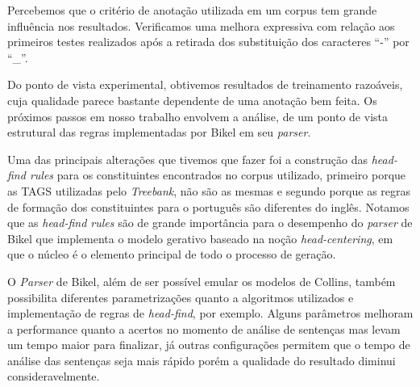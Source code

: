 Percebemos que o critério de anotação utilizada em um corpus tem grande influência nos resultados. Verificamos uma melhora expressiva com relação aos primeiros testes realizados após a retirada dos substituição dos caracteres ``{-}'' por ``\_''.

Do ponto de vista experimental, obtivemos resultados de treinamento razoáveis, cuja qualidade parece bastante dependente de uma anotação bem feita. Os próximos passos em nosso trabalho envolvem a análise, de um ponto de vista estrutural das regras implementadas por Bikel em seu \emph{parser}.

Uma das principais alterações que tivemos que fazer foi a construção das \emph{head-find rules} para os constituintes encontrados no corpus utilizado, primeiro porque as TAGS utilizadas pelo \emph{Treebank}, não são as mesmas e segundo porque as regras de formação dos constituintes para o português são diferentes do inglês. Notamos que as \emph{head-find rules} são de grande importância para o desempenho do \emph{parser} de Bikel que implementa o modelo gerativo baseado na noção \emph{head-centering}, em que o núcleo é o elemento principal de todo o processo de geração.

O \emph{Parser} de Bikel, além de ser possível emular os modelos de Collins, também possibilita diferentes parametrizações quanto a algoritmos utilizados e implementação de regras de \emph{head-find}, por exemplo. Alguns parâmetros melhoram a performance quanto a acertos no momento de análise de sentenças mas levam um tempo maior para finalizar, já outras configurações permitem que o tempo de análise das sentenças seja mais rápido porém a qualidade do resultado diminui consideravelmente.